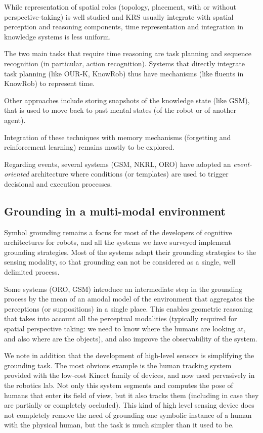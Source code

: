 \documentclass[journal]{IEEEtran}
\begin{document}
While representation of spatial roles (topology, placement, with or without
perspective-taking) is well studied and KRS usually integrate with spatial
perception and reasoning components, time representation and integration in
knowledge systems is less uniform.

The two main tasks that require time reasoning are task planning and sequence
recognition (in particular, action recognition). Systems that directly
integrate task planning (like OUR-K, {\sc KnowRob}) thus have mechanisms (like
fluents in {\sc KnowRob}) to represent time.

Other approaches include storing snapshots of the knowledge state (like GSM),
that is used to move back to past mental states (of the robot or of another
agent).

Integration of these techniques with memory mechanisms (forgetting and
reinforcement learning) remains mostly to be explored.

Regarding events, several systems (GSM, NKRL, ORO) have adopted an {\em
event-oriented} architecture where conditions (or templates) are used to
trigger decisional and execution processes.

\subsection{Grounding in a multi-modal environment}

Symbol grounding remains a focus for most of the developers of cognitive
architectures for robots, and all the systems we have surveyed implement
grounding strategies. Most of the systems
adapt their grounding strategies to the sensing modality, so that grounding can
not be considered as a single, well delimited process.

Some systems (ORO, GSM) introduce an intermediate step in the grounding process
by the mean of an amodal model of the environment that aggregates the
perceptions (or suppositions) in a single place. This enables geometric
reasoning that takes into account all the perceptual modalities (typically
required for spatial perspective taking: we need to know where the humans are
looking at, and also where are the objects), and also improve the observability
of the system.

We note in addition that the development of high-level sensors is simplifying
the grounding task. The most obvious example is the human tracking system
provided with the low-cost Kinect family of devices, and now used
pervasively in the robotics lab. Not only this system segments and computes the
pose of humans that enter its field of view, but it also tracks them (including
in case they are partially or completely occluded). This kind of high level
sensing device does not completely remove the need of grounding one symbolic
instance of a human with the physical human, but the task is much simpler than
it used to be.
\end{document}
